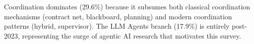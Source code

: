 \documentclass{article}
\begin{document}
\noindent
Coordination dominates (29.6\%) because it subsumes both classical coordination
mechanisms (contract net, blackboard, planning) and modern coordination patterns
(hybrid, supervisor). The LLM Agents branch (17.9\%) is entirely post-2023,
representing the surge of agentic AI research that motivates this survey.


%

%
\end{document}
